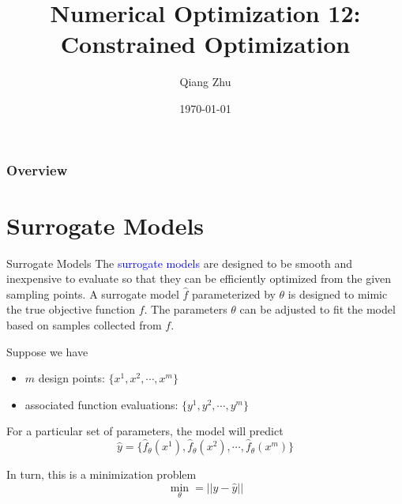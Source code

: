 \documentclass{beamer}
\title[Constrained Optimization]{Numerical Optimization 12: Constrained Optimization} %
\author{Qiang Zhu} %
\institute[University of Nevada Las Vegas] %
{
University of Nevada Las Vegas\\ %
\medskip
}
\date{\today} %
\begin{document}
\begin{frame}
\titlepage %
\end{frame}

\begin{frame}
\frametitle{Overview} %
\tableofcontents %
\end{frame}



\section{Surrogate Models}
\begin{frame}{Surrogate Models}
The \textcolor{blue}{surrogate models} are designed to be smooth and inexpensive to evaluate so that they can be efficiently optimized from the given sampling points. A surrogate model $\hat{f}$ parameterized by $\theta$ is designed to mimic the true objective function $f$. The parameters $\theta$ can be adjusted to fit the model based on samples collected from $f$. 

Suppose we have 
\begin{itemize}
    \item $m$ design points: $\{x^1, x^2, \cdots, x^m\}$
    \item associated function evaluations: $\{y^1, y^2, \cdots, y^m\}$
\end{itemize}
For a particular set of parameters, the model will predict
\begin{equation*}
    \hat{y} = \{\hat{f}_\theta(x^1), \hat{f}_\theta(x^2), \cdots, \hat{f}_\theta(x^m)\}
\end{equation*}

In turn, this is a minimization problem
\begin{equation*}
    \underset{\theta}{\min} = ||y-\hat{y}||
\end{equation*}
\end{frame}
\end{document}
